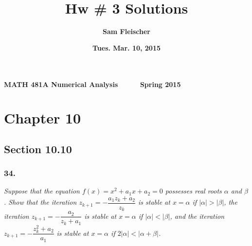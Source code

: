 \documentclass[12pt]{article}
\begin{document}
{\bf MATH 481A \hfill Numerical Analysis \ \ \ \ \ \hfill Spring 2015}

\title{\bf Hw \# 3 Solutions}
\author{\bf Sam Fleischer}
\date{\bf Tues. Mar. 10, 2015}

{\let\newpage\relax\maketitle}
\maketitle
\tableofcontents
\pagebreak

\section*{Chapter 10}

\subsection*{Section 10.10}

\subsubsection*{34.}
{\it Suppose that the equation $f(x) = x^2 + a_1x + a_2 = 0$ possesses real roots $\alpha$ and $\beta$.  Show that the iteration $z_{k+1} = -\dfrac{a_1z_k + a_2}{z_k}$ is stable at $x = \alpha$ if $|\alpha| > |\beta|$, the iteration $z_{k+1} = -\dfrac{a_2}{z_k + a_1}$ is stable at $x = \alpha$ if $|\alpha| < |\beta|$, and the iteration $z_{k+1} = -\dfrac{z_k^2 + a_2}{a_1}$ is stable at $x = \alpha$ if $2|\alpha| < |\alpha + \beta|$.}
\end{document}
